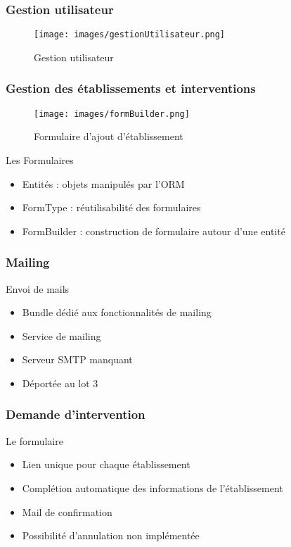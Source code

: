 \speaker{\Florian}

\begin{frame}
\frametitle{Gestion utilisateur}
      \begin{figure}[h]
	\texttt{[image: images/gestionUtilisateur.png]}
	\caption{Gestion utilisateur}
		  \end{figure}

\end{frame}

\begin{frame}
\frametitle{Gestion des établissements et interventions}
\begin{minipage}[c]{.35\linewidth}
      \begin{figure}[h]
		\texttt{[image: images/formBuilder.png]}
			\caption{\small{Formulaire d'ajout d'établissement}}
	  \end{figure}
   \end{minipage} \hfill
   \begin{minipage}[c]{.4\linewidth}
      \begin{block}{Les Formulaires}
		\begin{itemize}
			\item Entités : objets manipulés par l'ORM
			\item FormType : réutilisabilité des formulaires
			\item FormBuilder : construction de formulaire autour d'une entité
		\end{itemize}
	  \end{block}
   \end{minipage} \hfill
\end{frame}

\begin{frame}
\frametitle{Mailing}
\begin{block}{Envoi de mails}
	\begin{itemize}
		\item Bundle dédié aux fonctionnalités de mailing
		\item Service de mailing
		\item Serveur SMTP manquant
		\item Déportée au lot 3
	\end{itemize}
\end{block}
\end{frame}

\begin{frame}
\frametitle{Demande d'intervention}
\begin{block}{Le formulaire}
	\begin{itemize}
		\item Lien unique pour chaque établissement
		\item Complétion automatique des informations de l'établissement
		\item Mail de confirmation
		\item Possibilité d'annulation non implémentée
	\end{itemize}
\end{block}
\end{frame}